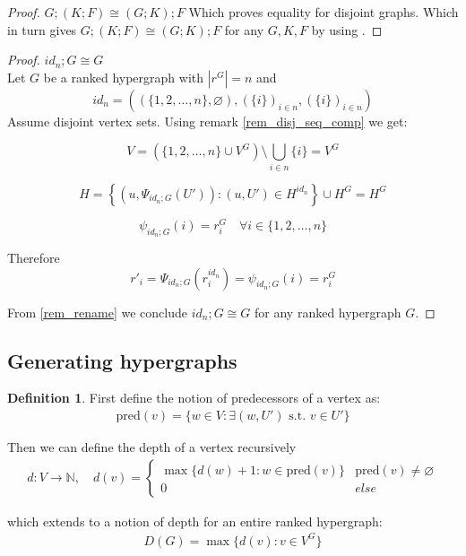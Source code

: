 \documentclass[12pt]{article}
\theoremstyle{definition}
\newtheorem{definition}[theorem]{Definition}
\newcommand{\N}{\mathbb{N}}
\newcommand{\1}{\mathbbm{1}}
\newcommand{\seq}{;}
\newcommand{\pred}{\text{pred}}
\begin{document}
\begin{proof}{$G\seq(K\seq F) \cong (G\seq K) \seq F$}
    Which proves equality for disjoint graphs. Which in turn gives $G\seq(K\seq F) \cong (G\seq K) \seq F$ for any $G,K,F$ by using .
\end{proof}

\begin{proof}{$id_n \seq G \cong G$}\\
    Let $G$ be a ranked hypergraph with $|r^G| = n$ and \[id_n = ((\{1,2,\dots,n\}, \varnothing), (\{i\})_{i\in n}, (\{i\})_{i\in n})\] Assume disjoint vertex sets. Using remark \ref{rem_disj_seq_comp} we get:

    \[
        V = (\{1,2,\dots,n\}\cup V^G) \setminus \bigcup_{i\in n}\{i\} = V^G
    \]
    
    \[
        H = \left\{ \left(u, \Psi_{id_n\seq G}(U')\right) : (u, U') \in H^{id_n} \right\} \cup H^G = H^G
    \]

    \[
        \psi_{id_n\seq G} (i) = r^G_i \quad \forall i\in \{1,2,\dots,n\}
    \]

    Therefore 
    \[
        r'_i = \Psi_{id_n\seq G}(r^{id_n}_i) = \psi_{id_n\seq G}(i) = r^G_i
    \]

    From \ref{rem_rename} we conclude $id_n \seq G \cong G$ for any ranked hypergraph $G$.
\end{proof}

\subsection{Generating hypergraphs}

\begin{definition}
    First define the notion of predecessors of a vertex as:
    \begin{align*}
        \pred(v) = \{w\in V : \exists(w, U') \text{ s.t. } v\in U'\}
    \end{align*}

    Then we can define the depth of a vertex recursively
    \begin{align*}
        d: V \to \N, \quad d(v) = 
        \begin{cases}
            \max\{d(w) + 1 : w\in \pred(v)\} & \pred(v) \neq \varnothing\\
            0 & else 
        \end{cases}
    \end{align*}

    which extends to a notion of depth for an entire ranked hypergraph: \begin{align*}
        D(G) = \max\{d(v) : v\in V^G\}
    \end{align*}
\end{definition} %
\end{document}
